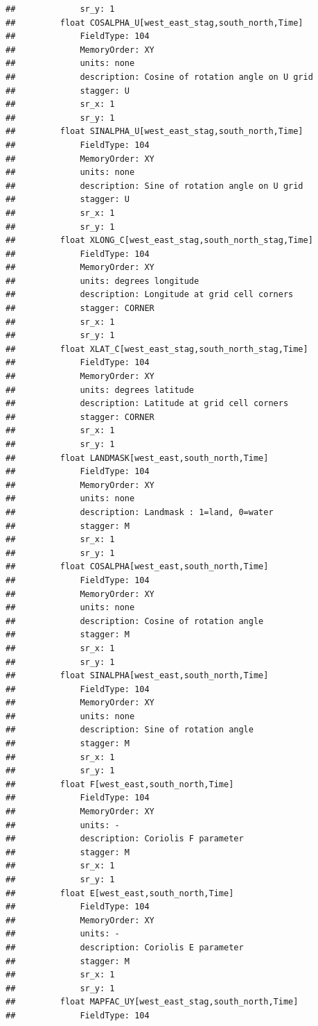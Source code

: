 \documentclass[]{book}
\theoremstyle{definition}
\theoremstyle{definition}
\theoremstyle{definition}
\theoremstyle{remark}
\begin{document}
\begin{verbatim}
##             sr_y: 1
##         float COSALPHA_U[west_east_stag,south_north,Time]   
##             FieldType: 104
##             MemoryOrder: XY 
##             units: none
##             description: Cosine of rotation angle on U grid
##             stagger: U
##             sr_x: 1
##             sr_y: 1
##         float SINALPHA_U[west_east_stag,south_north,Time]   
##             FieldType: 104
##             MemoryOrder: XY 
##             units: none
##             description: Sine of rotation angle on U grid
##             stagger: U
##             sr_x: 1
##             sr_y: 1
##         float XLONG_C[west_east_stag,south_north_stag,Time]   
##             FieldType: 104
##             MemoryOrder: XY 
##             units: degrees longitude
##             description: Longitude at grid cell corners
##             stagger: CORNER
##             sr_x: 1
##             sr_y: 1
##         float XLAT_C[west_east_stag,south_north_stag,Time]   
##             FieldType: 104
##             MemoryOrder: XY 
##             units: degrees latitude
##             description: Latitude at grid cell corners
##             stagger: CORNER
##             sr_x: 1
##             sr_y: 1
##         float LANDMASK[west_east,south_north,Time]   
##             FieldType: 104
##             MemoryOrder: XY 
##             units: none
##             description: Landmask : 1=land, 0=water
##             stagger: M
##             sr_x: 1
##             sr_y: 1
##         float COSALPHA[west_east,south_north,Time]   
##             FieldType: 104
##             MemoryOrder: XY 
##             units: none
##             description: Cosine of rotation angle
##             stagger: M
##             sr_x: 1
##             sr_y: 1
##         float SINALPHA[west_east,south_north,Time]   
##             FieldType: 104
##             MemoryOrder: XY 
##             units: none
##             description: Sine of rotation angle
##             stagger: M
##             sr_x: 1
##             sr_y: 1
##         float F[west_east,south_north,Time]   
##             FieldType: 104
##             MemoryOrder: XY 
##             units: -
##             description: Coriolis F parameter
##             stagger: M
##             sr_x: 1
##             sr_y: 1
##         float E[west_east,south_north,Time]   
##             FieldType: 104
##             MemoryOrder: XY 
##             units: -
##             description: Coriolis E parameter
##             stagger: M
##             sr_x: 1
##             sr_y: 1
##         float MAPFAC_UY[west_east_stag,south_north,Time]   
##             FieldType: 104

\end{verbatim}
\end{document}
